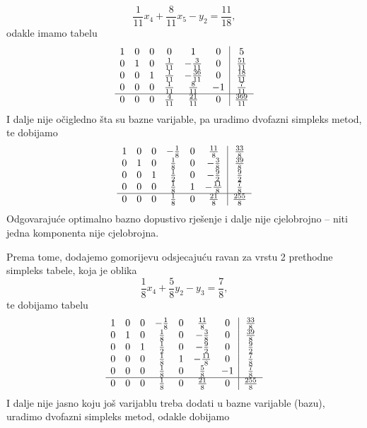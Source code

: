 \documentclass[a4paper, utf8, 11pt, colorlinks]{book}
\begin{document}
 $$ \frac{1}{11} x_4 + \frac{8}{11} x_5 - y_2 = \frac{11}{18},$$
 odakle imamo tabelu 
 $$\begin{array}{cccccc| c}
 1   &   0   &  0  &   0             &   1  &   0              &   5 \\
 0   &   1   &  0  &  \frac{1}{11}    &   -\frac{3}{11}    &  0 & \frac{51}{11} \\
 0   &   0   &  1  &  \frac{1}{11}    & -\frac{36}{11}       & 0 & \frac{18}{11}  \\
 0   &   0   &  0  &  \frac{1}{11}    &  \frac{8}{11}   & -1 & \frac{7}{11} \\ \hline
 0   &   0   &  0  &   \frac{4}{11}   &   \frac{21}{11} & 0 & \frac{369}{11}
\end{array} $$
I dalje nije očigledno šta su bazne varijable, pa uradimo dvofazni simpleks metod, te dobijamo 
 $$\begin{array}{cccccc| c}
1    &   0   &   0   &  -\frac{1}{8}   &   0    &    \frac{11}{8}    &  \frac{33}{8} \\
0    &   1   &   0   &   \frac{1}{8}   &   0    &    -\frac{3}{8}    & \frac{39}{8} \\
0    &   0   &   1   &   \frac{1}{2}   &   0    &    - \frac{9}{2}   & \frac{9}{2} \\
0    &   0   &   0   &   \frac{1}{8}   &   1    &    - \frac{11}{8}  & \frac{7}{8} \\ \hline
0    &   0   &   0   &   \frac{1}{8}   &   0    &     \frac{21}{8}   & \frac{255}{8}
\end{array} $$
Odgovarajuće optimalno bazno dopustivo rješenje i dalje nije cjelobrojno -- niti jedna komponenta nije cjelobrojna. 

Prema tome, dodajemo gomorijevu odsjecajuću ravan za vrstu 2 prethodne simpleks tabele, koja je oblika
$$  \frac{1}{8}x_4 + \frac{5}{8} y_2 - y_3 = \frac{7}{8},$$
te dobijamo tabelu
$$ \begin{array}{ccccccc| c}
1    &   0   &   0   &  -\frac{1}{8}   &   0    &    \frac{11}{8}    & 0 & \frac{33}{8} \\
0    &   1   &   0   &   \frac{1}{8}   &   0    &    -\frac{3}{8}    & 0 & \frac{39}{8} \\
0    &   0   &   1   &   \frac{1}{2}   &   0    &    - \frac{9}{2}   & 0 & \frac{9}{2} \\
0    &   0   &   0   &   \frac{1}{8}   &   1    &    - \frac{11}{8}  & 0    & \frac{7}{8} \\ 
0    &   0   &   0   &   \frac{1}{8}   &   0    &    \frac{5}{8}   & -1 & \frac{7}{8} \\ \hline
0    &   0   &   0   &   \frac{1}{8}   &   0    &     \frac{21}{8}   & 0 & \frac{255}{8}   
\end{array} $$
I dalje nije jasno koju još varijablu treba dodati u bazne varijable (bazu), uradimo dvofazni simpleks metod, odakle dobijamo 
\end{document}

